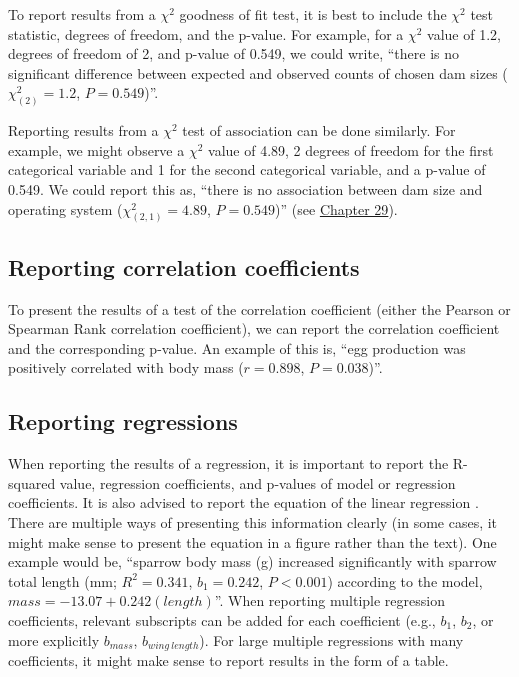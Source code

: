 \documentclass[
]{scrbook}
\begin{document}
To report results from a \(\chi^{2}\) goodness of fit test, it is best to include the \(\chi^{2}\) test statistic, degrees of freedom, and the p-value.
For example, for a \(\chi^{2}\) value of 1.2, degrees of freedom of 2, and p-value of 0.549, we could write, ``there is no significant difference between expected and observed counts of chosen dam sizes (\(\chi^{2}_{(2)} = 1.2\), \(P = 0.549\))''.

Reporting results from a \(\chi^{2}\) test of association can be done similarly.
For example, we might observe a \(\chi^{2}\) value of 4.89, 2 degrees of freedom for the first categorical variable and 1 for the second categorical variable, and a p-value of 0.549.
We could report this as, ``there is no association between dam size and operating system (\(\chi^{2}_{(2, 1)} = 4.89\), \(P = 0.549\))'' (see \protect\hyperlink{Chapter_29}{Chapter 29}).

\hypertarget{reporting-correlation-coefficients}{%
\subsection{Reporting correlation coefficients}\label{reporting-correlation-coefficients}}

To present the results of a test of the correlation coefficient (either the Pearson or Spearman Rank correlation coefficient), we can report the correlation coefficient and the corresponding p-value.
An example of this is, ``egg production was positively correlated with body mass (\(r = 0.898\), \(P = 0.038\))''.

\hypertarget{reporting-regressions}{%
\subsection{Reporting regressions}\label{reporting-regressions}}

When reporting the results of a regression, it is important to report the R-squared value, regression coefficients, and p-values of model or regression coefficients.
It is also advised to report the equation of the linear regression \citep{Lang1997}.
There are multiple ways of presenting this information clearly (in some cases, it might make sense to present the equation in a figure rather than the text).
One example would be, ``sparrow body mass (g) increased significantly with sparrow total length (mm; \(R^{2} = 0.341\), \(b_{1} = 0.242\), \(P < 0.001\)) according to the model, \(mass = -13.07 + 0.242(length)\)''.
When reporting multiple regression coefficients, relevant subscripts can be added for each coefficient (e.g., \(b_{1}\), \(b_{2}\), or more explicitly \(b_{mass}\), \(b_{wing\:length}\)).
For large multiple regressions with many coefficients, it might make sense to report results in the form of a table.
\end{document}
